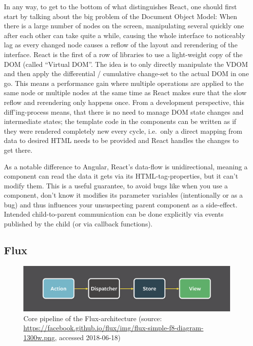 \documentclass[a4paper,,tablecaptionabove]{scrbook}
\begin{document}
In any way, to get to the bottom of what distinguishes React, one should
first start by talking about the big problem of the Document Object
Model: When there is a large number of nodes on the screen, manipulating
several quickly one after each other can take quite a while, causing the
whole interface to noticeably lag as every changed node causes a reflow
of the layout and rerendering of the interface. React is the first of a
row of libraries to use a light-weight copy of the DOM (called
\enquote{Virtual DOM}. The idea is to only directly manipulate the VDOM
and then apply the differential / cumulative change-set to the actual
DOM in one go. This means a performance gain where multiple operations
are applied to the same node or multiple nodes at the same time as React
makes sure that the slow reflow and rerendering only happens once. From
a development perspective, this diff'ing-process means, that there is no
need to manage DOM state changes and intermediate states; the template
code in the components can be written as if they were rendered
completely new every cycle, i.e.~only a direct mapping from data to
desired HTML needs to be provided and React handles the changes to get
there.

As a notable difference to Angular, React's data-flow is unidirectional,
meaning a component can read the data it gets via its
HTML-tag-properties, but it can't modify them. This is a useful
guarantee, to avoid bugs like when you use a component, don't know it
modifies its parameter variables (intentionally or as a bug) and thus
influences your unsuspecting parent component as a side-effect. Intended
child-to-parent communication can be done explicitly via events
published by the child (or via callback functions).

\hypertarget{sec:flux}{%
\subsection{Flux}\label{sec:flux}}

\begin{figure}
\hypertarget{fig:flux_simple}{%
\centering
\includegraphics{./tex2pdf.11982/961657e641dd45721b96b7b632db66a6dc03e949.png}
\caption{Core pipeline of the Flux-architecture (source:
\url{https://facebook.github.io/flux/img/flux-simple-f8-diagram-1300w.png},
accessed 2018-06-18)}\label{fig:flux_simple}
}
\end{figure}
\end{document}
